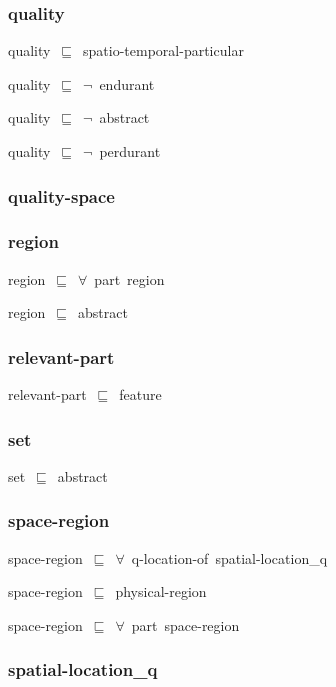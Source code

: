 \documentclass{article}
\begin{document}
\subsubsection*{quality}

quality~\ensuremath{\sqsubseteq}~spatio-temporal-particular~

quality~\ensuremath{\sqsubseteq}~\ensuremath{\lnot}~endurant

quality~\ensuremath{\sqsubseteq}~\ensuremath{\lnot}~abstract

quality~\ensuremath{\sqsubseteq}~\ensuremath{\lnot}~perdurant

\subsubsection*{quality-space}

\subsubsection*{region}

region~\ensuremath{\sqsubseteq}~\ensuremath{\forall}~part~region~

region~\ensuremath{\sqsubseteq}~abstract~

\subsubsection*{relevant-part}

relevant-part~\ensuremath{\sqsubseteq}~feature~

\subsubsection*{set}

set~\ensuremath{\sqsubseteq}~abstract~

\subsubsection*{space-region}

space-region~\ensuremath{\sqsubseteq}~\ensuremath{\forall}~q-location-of~spatial-location\_q~

space-region~\ensuremath{\sqsubseteq}~physical-region~

space-region~\ensuremath{\sqsubseteq}~\ensuremath{\forall}~part~space-region~

\subsubsection*{spatial-location_q}
\end{document}
